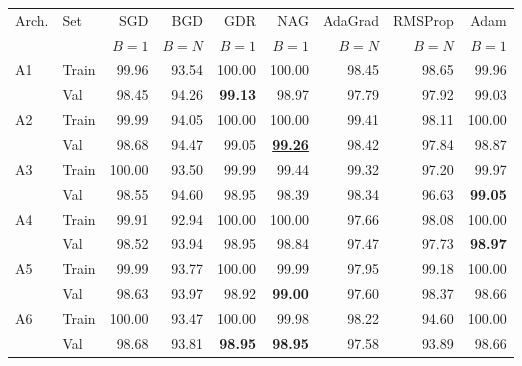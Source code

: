 \begin{tabular}{llrrrrrrr}
\toprule
Arch. & Set & SGD & BGD & GDR & NAG & AdaGrad & RMSProp & Adam \\
 & & {\scriptsize $B{=}1$} & {\scriptsize $B{=}N$} & {\scriptsize $B{=}1$} & {\scriptsize $B{=}1$} & {\scriptsize $B{=}N$} & {\scriptsize $B{=}N$} & {\scriptsize $B{=}1$} \\
\midrule
A1 & Train & 99.96 & 93.54 & 100.00 & 100.00 & 98.45 & 98.65 & 99.96 \\
 & Val & 98.45 & 94.26 & \textbf{99.13} & 98.97 & 97.79 & 97.92 & 99.03 \\
\addlinespace[2pt]
A2 & Train & 99.99 & 94.05 & 100.00 & 100.00 & 99.41 & 98.11 & 100.00 \\
 & Val & 98.68 & 94.47 & 99.05 & \underline{\textbf{99.26}} & 98.42 & 97.84 & 98.87 \\
\addlinespace[2pt]
A3 & Train & 100.00 & 93.50 & 99.99 & 99.44 & 99.32 & 97.20 & 99.97 \\
 & Val & 98.55 & 94.60 & 98.95 & 98.39 & 98.34 & 96.63 & \textbf{99.05} \\
\addlinespace[2pt]
A4 & Train & 99.91 & 92.94 & 100.00 & 100.00 & 97.66 & 98.08 & 100.00 \\
 & Val & 98.52 & 93.94 & 98.95 & 98.84 & 97.47 & 97.73 & \textbf{98.97} \\
\addlinespace[2pt]
A5 & Train & 99.99 & 93.77 & 100.00 & 99.99 & 97.95 & 99.18 & 100.00 \\
 & Val & 98.63 & 93.97 & 98.92 & \textbf{99.00} & 97.60 & 98.37 & 98.66 \\
\addlinespace[2pt]
A6 & Train & 100.00 & 93.47 & 100.00 & 99.98 & 98.22 & 94.60 & 100.00 \\
 & Val & 98.68 & 93.81 & \textbf{98.95} & \textbf{98.95} & 97.58 & 93.89 & 98.66 \\
\bottomrule
\end{tabular}
